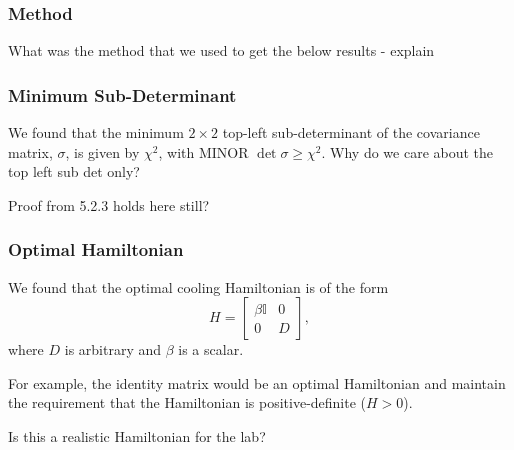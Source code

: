 \documentclass[11pt,a4paper]{article}
\numberwithin{equation}{section}
\begin{document}
	\color{red}\subsubsection{Method}\color{black}
	What was the method that we used to get the below results - explain
	
	\subsubsection{Minimum Sub-Determinant}
	We found that the minimum $2 \times 2$ top-left sub-determinant of the covariance matrix, $\sigma$, is given by $\chi^{2}$, with MINOR $\det \sigma \geq \chi^{2}$. Why do we care about the top left sub det only?
	
	\color{blue}Proof from 5.2.3 holds here still?\color{black}	
	
	\subsubsection{Optimal Hamiltonian}
	We found that the optimal cooling Hamiltonian is of the form
	\begin{equation}\label{eq:43}
	H =
	\left[
	\begin{array}{c|c}
	\beta \mathbb{I} & 0 \\
	\hline
	0 & D
	\end{array}
	\right],
	\end{equation}where $D$ is arbitrary and $\beta$ is a scalar.
	
	For example, the identity matrix would be an optimal Hamiltonian and maintain the requirement that the Hamiltonian is positive-definite ($H>0$).
	
	\color{blue}Is this a realistic Hamiltonian for the lab?\color{black}
	
\end{document}
